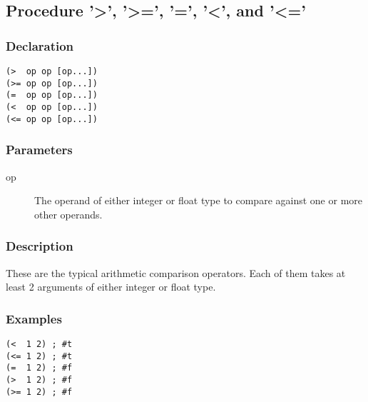 \subsection{Procedure '>', '>=', '=', '<', and '<='}
\label{builtins/arithmetic-comparison}

\subsubsection*{Declaration}
\begin{lstlisting}
(>  op op [op...])
(>= op op [op...])
(=  op op [op...])
(<  op op [op...])
(<= op op [op...])
\end{lstlisting}

\subsubsection*{Parameters}
\begin{description}
	\item[op] The operand of either integer or float type to compare against one or more other operands.
\end{description}

\subsubsection*{Description}
These are the typical arithmetic comparison operators. Each of them takes at least 2 arguments of either integer or float type.

\subsubsection*{Examples}
\begin{lstlisting}
(<  1 2) ; #t
(<= 1 2) ; #t
(=  1 2) ; #f
(>  1 2) ; #f
(>= 1 2) ; #f
\end{lstlisting}

